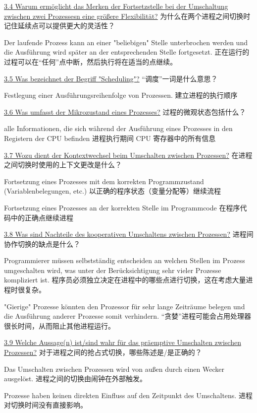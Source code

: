 \documentclass[fleqn]{article}
\begin{document}
\noindent\uline{3.4 Warum ermöglicht das Merken der Fortsetzstelle bei der Umschaltung zwischen zwei Prozessesn eine größere Flexibilität?}
为什么在两个进程之间切换时记住延续点可以提供更大的灵活性？

Der laufende Prozess kann an einer "beliebigen" Stelle unterbrochen werden und die Ausführung wird später an der entsprechenden Stelle fortgesetzt.
正在运行的过程可以在“任何”点中断，然后执行将在适当的点继续。

\noindent\uline{3.5 Was bezeichnet der Begriff "Scheduling"?}
“调度”一词是什么意思？

Festlegung einer Ausführungsreihenfolge von Prozessen. 建立进程的执行顺序

\noindent\uline{3.6 Was umfasst der Mikrozustand eines Prozesses?}
过程的微观状态包括什么？

alle Informationen, die sich während der Ausführung eines Prozesses in den Registern der CPU befinden
进程执行期间 CPU 寄存器中的所有信息

\noindent\uline{3.7 Wozu dient der Kontextwechsel beim Umschalten zwischen Prozessen?}
在进程之间切换时使用的上下文更改是什么？

Fortsetzung eines Prozesses mit dem korrekten Programmzustand (Variablenbelegungen, etc.)
以正确的程序状态（变量分配等）继续流程

Fortsetzung eines Prozesses an der korrekten Stelle im Programmcode
在程序代码中的正确点继续进程

\noindent\uline{3.8 Was sind Nachteile des kooperativen Umschaltens zwischen Prozessen?}
进程间协作切换的缺点是什么？

Programmierer müssen selbstständig entscheiden an welchen Stellen im Prozess umgeschalten wird, was unter der Berücksichtigung sehr vieler Prozesse kompliziert ist.
程序员必须独立决定在进程中的哪些点进行切换，这在考虑大量进程时很复杂。

"Gierige" Prozesse könnten den Prozessor für sehr lange Zeiträume belegen und die Ausführung anderer Prozesse somit verhindern.
“贪婪”进程可能会占用处理器很长时间，从而阻止其他进程运行。

\noindent\uline{3.9 Welche Aussage(n) ist/sind wahr für das präemptive Umschalten zwischen Prozessen?}
对于进程之间的抢占式切换，哪些陈述是/是正确的？

Das Umschalten zwischen Prozessen wird von außen durch einen Wecker ausgelöst.
进程之间的切换由闹钟在外部触发。

Prozesse haben keinen direkten Einfluss auf den Zeitpunkt des Umschaltens.
进程对切换时间没有直接影响。
\end{document}
